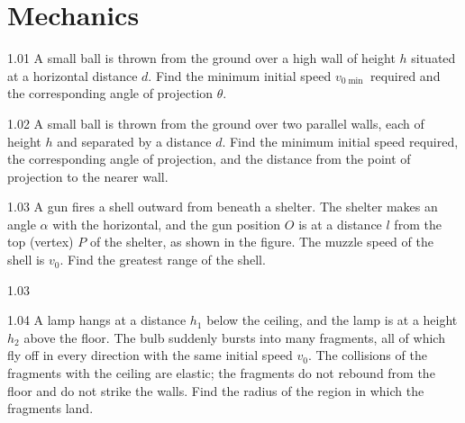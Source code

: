 \section{Mechanics}

\begin{problem}{1.01}
A small ball is thrown from the ground over a high wall of height $h$ situated at a horizontal distance $d$. Find the minimum initial speed $v_{0\min}$ required and the corresponding angle of projection $\theta$.
\end{problem}

\begin{problem}{1.02}
A small ball is thrown from the ground over two parallel walls, each of height $h$ and separated by a distance $d$. Find the minimum initial speed required, the corresponding angle of projection, and the distance from the point of projection to the nearer wall.
\end{problem}

\begin{problem}{1.03}
A gun fires a shell outward from beneath a shelter. The shelter makes an angle $\alpha$ with the horizontal, and the gun position $O$ is at a distance $l$ from the top (vertex) $P$ of the shelter, as shown in the figure. The muzzle speed of the shell is $v_0$. Find the greatest range of the shell.
\end{problem}

\begin{figbox}{1.03}
\end{figbox}

\begin{problem}{1.04}
A lamp hangs at a distance $h_1$ below the ceiling, and the lamp is at a height $h_2$ above the floor. The bulb suddenly bursts into many fragments, all of which fly off in every direction with the same initial speed $v_0$. The collisions of the fragments with the ceiling are elastic; the fragments do not rebound from the floor and do not strike the walls. Find the radius of the region in which the fragments land.
\end{problem}

